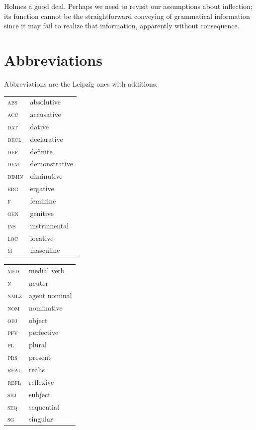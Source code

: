 \documentclass[output=paper,colorlinks,citecolor=brown]{langscibook}
\begin{document}
Holmes a good deal. Perhaps we need to revisit our assumptions about inflection; its function cannot be the straightforward conveying of grammatical information since it may fail to realize that information, apparently without consequence.


  
\section*{Abbreviations}
Abbreviations are the Leipzig ones with additions:

\medskip

\begin{tabularx}{.45\textwidth}{lQ}
	\textsc{abs} & absolutive \\
	\textsc{acc} & accusative \\
	\textsc{dat} & dative \\
	\textsc{decl} & declarative \\
	\textsc{def} & definite \\
	\textsc{dem} & demonstrative \\
	\textsc{dimin} & diminutive \\
	\textsc{erg} & ergative \\
	\textsc{f} & feminine \\
	\textsc{gen} & genitive \\
	\textsc{ins} & instrumental \\
	\textsc{loc} & locative \\
	\textsc{m} & masculine \\
\end{tabularx}
\begin{tabularx}{.45\textwidth}{lQ}
	\textsc{med} & medial verb \\
	\textsc{n} & neuter \\
	\textsc{nmlz} & agent nominal \\
	\textsc{nom} & nominative \\
	\textsc{obj} & object \\
	\textsc{pfv} & perfective \\
	\textsc{pl} & plural \\
	\textsc{prs} & present \\
	\textsc{real} & realis \\
	\textsc{refl} & reflexive \\
	\textsc{sbj} & subject \\
	\textsc{seq} & sequential \\
	\textsc{sg} & singular \\
\end{tabularx}
\end{document}
